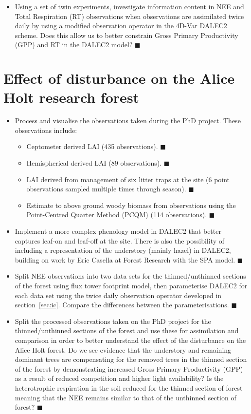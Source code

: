 \documentclass[11pt]{article}
\begin{document}
\begin{itemize}
\begin{itemize}
\end{itemize}
\item Using a set of twin experiments, investigate information content in NEE and Total Respiration (RT) observations when observations are assimilated twice daily by using a modified observation operator in the 4D-Var DALEC2 scheme. Does this allow us to better constrain Gross Primary Productivity (GPP) and RT in the DALEC2 model? {\color{yellow} $\blacksquare$}  
\end{itemize}


\section{Effect of disturbance on the Alice Holt research forest}
\begin{itemize}
\item Process and visualise the observations taken during the PhD project. These observations include:
\begin{itemize}
\item Ceptometer derived LAI (435 observations). {\color{green} $\blacksquare$}
\item Hemispherical derived LAI (89 observations). {\color{green} $\blacksquare$} 
\item LAI derived from management of six litter traps at the site (6 point observations sampled multiple times through season). {\color{green} $\blacksquare$}
\item Estimate to above ground woody biomass from observations using the Point-Centred Quarter Method (PCQM) (114 observations). {\color{green} $\blacksquare$}
\end{itemize}
\item Implement a more complex phenology model in DALEC2 that better captures leaf-on and leaf-off at the site. There is also the possibility of including a representation of the understory (mainly hazel) in DALEC2, building on work by Eric Casella at Forest Research with the SPA model. {\color{yellow} $\blacksquare$}
\item Split NEE observations into two data sets for the thinned/unthinned sections of the forest using flux tower footprint model, then parameterise DALEC2 for each data set using the twice daily observation operator developed in section~\ref{sec:ic}. Compare the differences between the parameterisations. {\color{yellow} $\blacksquare$}
\item Split the processed observations taken on the PhD project for the thinned/unthinned sections of the forest and use these for assimilation and comparison in order to better understand the effect of the disturbance on the Alice Holt forest. Do we see evidence that the understory and remaining dominant trees are compensating for the removed trees in the thinned section of the forest by demonstrating increased Gross Primary Productivity (GPP) as a result of reduced competition and higher light availability? Is the heterotrophic respiration in the soil reduced for the thinned section of forest meaning that the NEE remains similar to that of the unthinned section of forest? {\color{red} $\blacksquare$}
\end{itemize}
\end{document}
